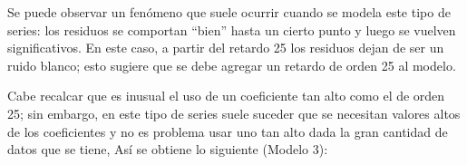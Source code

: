 Se puede observar un fen\'{o}meno que suele ocurrir cuando se modela este tipo de series: los residuos se comportan ``bien'' hasta un cierto punto y luego se vuelven significativos. En este caso, a partir del retardo 25 los residuos dejan de ser un ruido blanco; esto sugiere que se debe agregar un retardo de orden 25 al modelo.\newline

Cabe recalcar que es inusual el uso de un coeficiente tan alto como el de orden 25; sin embargo, en este tipo de series suele suceder que se necesitan valores altos de los coeficientes y no es problema usar uno tan alto dada la gran cantidad de datos que se tiene, As\'{i} se obtiene lo siguiente (Modelo 3):

